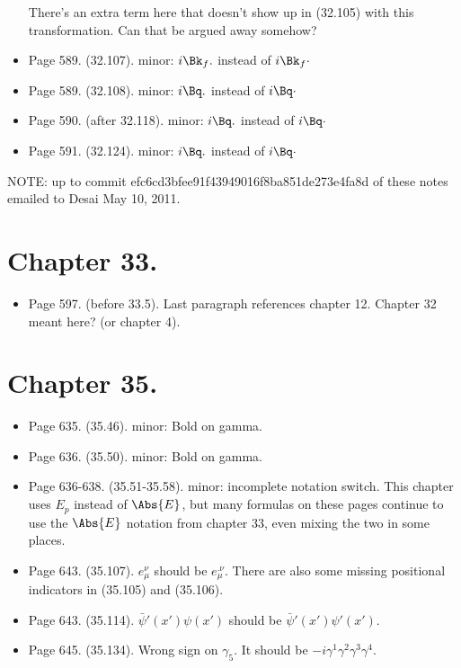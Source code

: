 \begin{itemize}
There's an extra term here that doesn't show up in (32.105) with this transformation.  Can that be argued away somehow?

\item Page 589.  (32.107).  minor: $i \Bk_f .$ instead of $i \Bk_f \cdot$
\item Page 589.  (32.108).  minor: $i \Bq .$ instead of $i \Bq \cdot$
\item Page 590.  (after 32.118).  minor: $i \Bq .$ instead of $i \Bq \cdot$
\item Page 591.  (32.124).  minor: $i \Bq .$ instead of $i \Bq \cdot$
\end{itemize}

NOTE: up to commit efc6cd3bfee91f43949016f8ba851de273e4fa8d of these notes emailed to Desai May 10, 2011.
 
\section{Chapter 33.}

\begin{itemize}
\item Page 597.  (before 33.5).  Last paragraph references chapter 12.  Chapter 32 meant here?  (or chapter 4).
\end{itemize}

\section{Chapter 35.}

\begin{itemize}
\item Page 635.  (35.46).  minor: Bold on gamma. 
\item Page 636.  (35.50).  minor: Bold on gamma. 
\item Page 636-638.  (35.51-35.58).  minor: incomplete notation switch.  This chapter uses $E_p$ instead of $\Abs{E}$, but many formulas on these pages continue to use the $\Abs{E}$ notation from chapter 33, even mixing the two in some places.
\item Page 643.  (35.107).  $e_\mu^{\nu}$ should be $e_\mu^{.\nu}$.  There are also some missing positional indicators in (35.105) and (35.106).
\item Page 643.  (35.114).  $\bar{\psi}'(x')\psi(x')$ should be $\bar{\psi}'(x')\psi'(x')$.
\item Page 645.  (35.134).  Wrong sign on $\gamma_5$.  It should be $-i \gamma^1 \gamma^2 \gamma^3 \gamma^4$.
\end{itemize}

